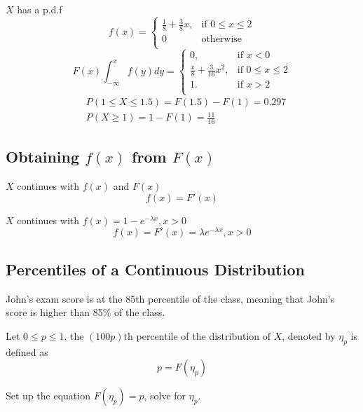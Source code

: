 \begin{exmp}
$X$ has a p.d.f 
\[f(x)=\begin{cases}
\frac{1}{8}+\frac{3}{8}x, &\text{if } 0\leq x\leq 2\\
0&\text{otherwise}\\
\end{cases}\]
\[F(x)\int_{-\infty}^{x}f(y)dy=\begin{cases}
0,		&\text{if } x<0\\
\frac{x}{8}+\frac{3}{16}x^2, &\text{if } 0\leq x\leq 2\\
1.		&\text{if }x>2\\
\end{cases}\]
\begin{align*}
&P(1\leq X \leq 1.5)=F(1.5)-F(1)=0.297\\
&P(X\geq 1)=1-F(1)=\frac{11}{16}
\end{align*}
\end{exmp}

\subsection{Obtaining $f(x)$ from $F(x)$}
$X$ continues with $f(x)$ and $F(x)$
\[f(x)=F'(x)\]

\begin{exmp}
$X$ continues with $f(x)=1-e^{-\lambda x}, x>0$
\[f(x)=F'(x)= \lambda e^{-\lambda x}, x>0 \]
\end{exmp}

\subsection{Percentiles of a Continuous Distribution}
\begin{exmp}
John's exam score is at the 85th percentile of the class, meaning that John's score is higher than 85\% of the class.
\end{exmp}

\begin{defn}
Let $0 \leq p \leq 1$, the $(100p)$th percentile of the distribution of $X$, denoted by $\eta_p$ is defined as 
\[p=F(\eta_p)\]

Set up the equation $F(\eta_p)=p$, solve for $\eta_p$.
\end{defn}

